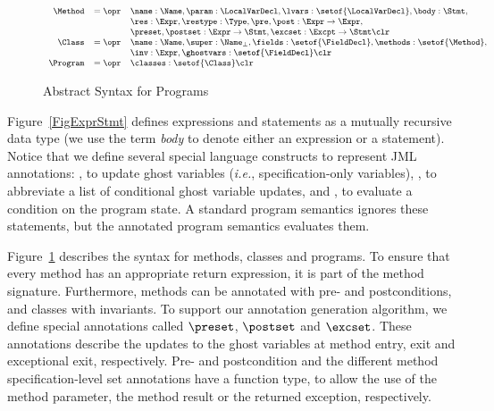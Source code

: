 \begin{figure}[t]
\[{\small
\begin{array}{rcl}
\Method & = \opr & \name : \Name,
                   \param : \LocalVarDecl,
                   \lvars : \setof{\LocalVarDecl},
                   \body : \Stmt,\\
        &        & \res : \Expr,
                   \restype : \Type,
                   \pre, \post : \Expr \rightarrow \Expr, \\
        &        & \preset, \postset : \Expr \rightarrow \Stmt,
                   \excset : \Excpt \rightarrow \Stmt \clr \\
\Class & = \opr & \name : \Name,
                  \super : \Name_{\bot},
                  \fields : \setof{\FieldDecl},
                  \methods : \setof{\Method},\\
        &       & \inv : \Expr,
                  \ghostvars : \setof{\FieldDecl} \clr\\
\Program & = \opr & \classes : \setof{\Class} \clr
\end{array}}
\]
\caption{Abstract Syntax for Programs}\label{FigProgram}
\end{figure}


Figure~\ref{FigExprStmt} defines expressions and statements as a
mutually recursive data type (we use the term \emph{body} to denote
either an expression or a statement). Notice that we define several special
language constructs to represent JML annotations: \Set,
to update ghost variables (\emph{i.e.}, specification-only variables),
\CaseJML, to abbreviate a list of conditional ghost variable updates,
and \Assert, to evaluate a condition on the program state. A standard
program semantics ignores these statements, but the annotated program
semantics evaluates them.

Figure~\ref{FigProgram} describes the syntax for methods,
classes and programs. To ensure that every method has an appropriate
return expression, it is part of the method signature.
Furthermore, methods can be annotated with pre- and postconditions, and
classes with invariants. To support our annotation generation
algorithm, we define special annotations called
\(\preset\), \(\postset\) and \(\excset\). These annotations describe
the updates to the ghost variables at method entry, exit and
exceptional exit, respectively.
Pre- and postcondition and the different method specification-level set
annotations have a function type, to allow the use of the method parameter,
the method result or the returned exception, respectively.

